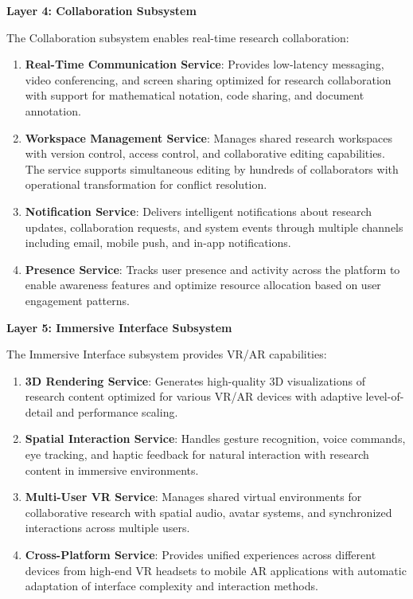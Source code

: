 \documentclass[10pt,twocolumn]{article}
\begin{document}
\textbf{Layer 4: Collaboration Subsystem}

The Collaboration subsystem enables real-time research collaboration:

\begin{enumerate}
    \item \textbf{Real-Time Communication Service}: Provides low-latency messaging, video conferencing, and screen sharing optimized for research collaboration with support for mathematical notation, code sharing, and document annotation.
    
    \item \textbf{Workspace Management Service}: Manages shared research workspaces with version control, access control, and collaborative editing capabilities. The service supports simultaneous editing by hundreds of collaborators with operational transformation for conflict resolution.
    
    \item \textbf{Notification Service}: Delivers intelligent notifications about research updates, collaboration requests, and system events through multiple channels including email, mobile push, and in-app notifications.
    
    \item \textbf{Presence Service}: Tracks user presence and activity across the platform to enable awareness features and optimize resource allocation based on user engagement patterns.
\end{enumerate}

\textbf{Layer 5: Immersive Interface Subsystem}

The Immersive Interface subsystem provides VR/AR capabilities:

\begin{enumerate}
    \item \textbf{3D Rendering Service}: Generates high-quality 3D visualizations of research content optimized for various VR/AR devices with adaptive level-of-detail and performance scaling.
    
    \item \textbf{Spatial Interaction Service}: Handles gesture recognition, voice commands, eye tracking, and haptic feedback for natural interaction with research content in immersive environments.
    
    \item \textbf{Multi-User VR Service}: Manages shared virtual environments for collaborative research with spatial audio, avatar systems, and synchronized interactions across multiple users.
    
    \item \textbf{Cross-Platform Service}: Provides unified experiences across different devices from high-end VR headsets to mobile AR applications with automatic adaptation of interface complexity and interaction methods.
\end{enumerate}
\end{document}

